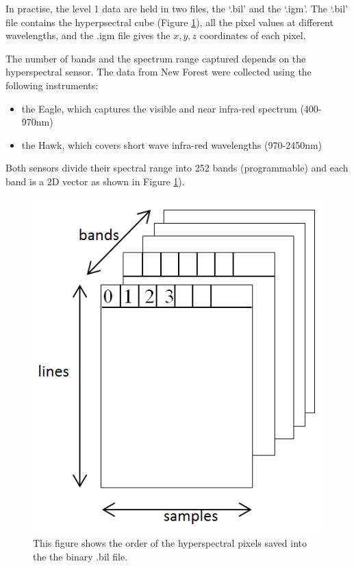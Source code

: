 \documentclass{subfiles}
\begin{document}
In practise, the level 1 data are held in two files, the `.bil' and the `.igm'. The `.bil' file contains the hyperpsectral cube (Figure \ref{fig:hyperspectralCube}), all the pixel values at different wavelengths, and the .igm file gives the $x, y, z$ coordinates of each pixel.  
	
	\par The number of bands and the spectrum range captured depends on the hyperspectral sensor. The data from New Forest were collected using the following instruments:
	\begin{itemize}
		\item the Eagle, which captures the visible and near infra-red spectrum (400-970nm)
		\item the Hawk, which covers short wave infra-red wavelengths (970-2450nm) 
	\end{itemize}
	Both sensors divide their spectral range into 252 bands (programmable) and each band is a 2D vector as shown in Figure \ref{fig:hyperspectralCube}).
	
	\begin{figure}[!htbp]
		\centering
		\includegraphics[width=\textwidth/5*2]{img/HI_bilFile}
		\caption[Hyperpsectral Cube]{This figure shows the order of the hyperspectral pixels saved into the the binary .bil file.}
		\label{fig:hyperspectralCube}
	\end{figure}
	
\end{document}
